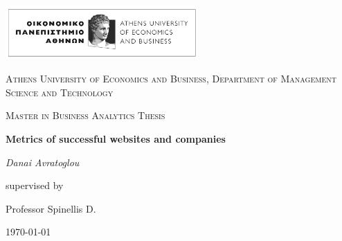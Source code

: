 \documentclass{book}
\begin{document}
\begin{titlepage}
	\centering
	\includegraphics[width=0.55\textwidth]{../R/photos/aueb.png}\par\vspace{1cm}
	{\scshape\LARGE Athens University of Economics and Business, Department of Management Science and Technology\par}
	\vspace{1cm}
	{\scshape\Large Master in Business Analytics Thesis\par}
	\vspace{1.5cm}
	{\huge\bfseries Metrics of successful websites and companies\par}
	\vspace{2cm}
	{\Large\itshape Danai Avratoglou\par}
	\vfill
	supervised by\par
	Professor Spinellis D. 

	\vfill

	{\large \today\par}
\end{titlepage}
\end{document}
